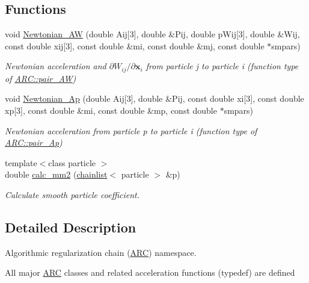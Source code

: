 \subsection*{Functions}
\begin{DoxyCompactItemize}
\item 
void \hyperlink{namespaceARC_ab9fc6518902e918927d8c6bd3d51401d}{Newtonian\+\_\+\+AW} (double Aij\mbox{[}3\mbox{]}, double \&Pij, double p\+Wij\mbox{[}3\mbox{]}, double \&Wij, const double xij\mbox{[}3\mbox{]}, const double \&mi, const double \&mj, const double $\ast$smpars)
\begin{DoxyCompactList}\small\item\em Newtonian acceleration and $\partial W_{ij}/\partial \mathbf{x}_i$ from particle j to particle i (function type of \hyperlink{namespaceARC_a5c4308ca4a8d0e0ff59fdce30f00274c}{A\+R\+C\+::pair\+\_\+\+AW}) \end{DoxyCompactList}\item 
void \hyperlink{namespaceARC_a70d2d18fc72d05606cb2c991ada4c64b}{Newtonian\+\_\+\+Ap} (double Aij\mbox{[}3\mbox{]}, double \&Pij, const double xi\mbox{[}3\mbox{]}, const double xp\mbox{[}3\mbox{]}, const double \&mi, const double \&mp, const double $\ast$smpars)
\begin{DoxyCompactList}\small\item\em Newtonian acceleration from particle p to particle i (function type of \hyperlink{namespaceARC_aed8f19a0c6ae7dc0bb3696b337d7b9f6}{A\+R\+C\+::pair\+\_\+\+Ap}) \end{DoxyCompactList}\item 
{\footnotesize template$<$class particle $>$ }\\double \hyperlink{namespaceARC_a8d6c876e9d20067d0e8a5c1c4c2c4be6}{calc\+\_\+mm2} (\hyperlink{classARC_1_1chainlist}{chainlist}$<$ particle $>$ \&p)
\begin{DoxyCompactList}\small\item\em Calculate smooth particle coefficient. \end{DoxyCompactList}\end{DoxyCompactItemize}


\subsection{Detailed Description}
Algorithmic regularization chain (\hyperlink{namespaceARC}{A\+RC}) namespace. 

All major \hyperlink{namespaceARC}{A\+RC} classes and related acceleration functions (typedef) are defined 

